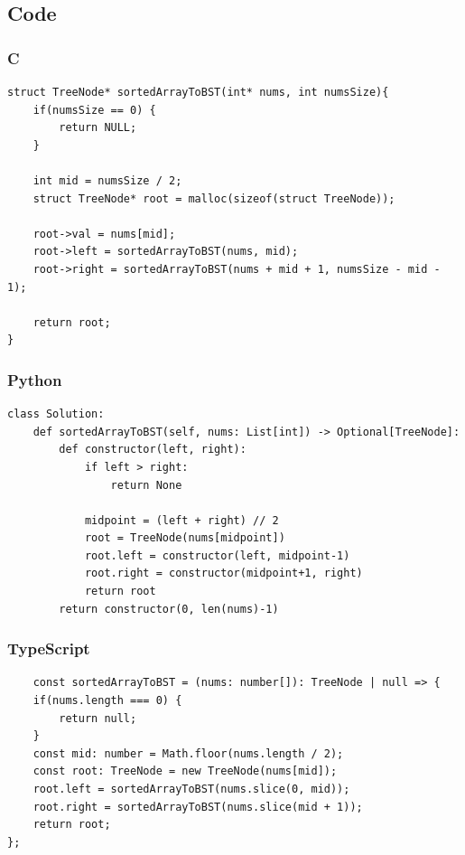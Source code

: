 \documentclass[11pt]{article}
\begin{document}
\subsection{Code}
\subsubsection{C}

\begin{verbatim}
struct TreeNode* sortedArrayToBST(int* nums, int numsSize){
    if(numsSize == 0) {
        return NULL;
    }

    int mid = numsSize / 2;
    struct TreeNode* root = malloc(sizeof(struct TreeNode));

    root->val = nums[mid];
    root->left = sortedArrayToBST(nums, mid);
    root->right = sortedArrayToBST(nums + mid + 1, numsSize - mid - 1);

    return root;
}
\end{verbatim}

\subsubsection{Python}

\begin{verbatim}
class Solution:
    def sortedArrayToBST(self, nums: List[int]) -> Optional[TreeNode]:
        def constructor(left, right):
            if left > right:
                return None

            midpoint = (left + right) // 2
            root = TreeNode(nums[midpoint])
            root.left = constructor(left, midpoint-1)
            root.right = constructor(midpoint+1, right)
            return root
        return constructor(0, len(nums)-1)
\end{verbatim}

\subsubsection{TypeScript}

\begin{verbatim}
    const sortedArrayToBST = (nums: number[]): TreeNode | null => {
    if(nums.length === 0) {
        return null;
    }
    const mid: number = Math.floor(nums.length / 2);
    const root: TreeNode = new TreeNode(nums[mid]);
    root.left = sortedArrayToBST(nums.slice(0, mid));
    root.right = sortedArrayToBST(nums.slice(mid + 1));
    return root;
};
\end{verbatim}
\end{document}
